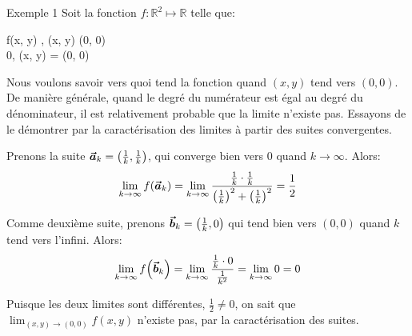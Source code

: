 \documentclass[a4paper]{article}
\begin{document}
\begin{parag}{Exemple 1}
    Soit la fonction $f : \mathbb{R}^2 \mapsto \mathbb{R}$ telle que: 
    \begin{functionbypart}{f\left(x, y\right)}
        , \mathspace {} \left(x, y\right) \neq \left(0, 0\right) \\
        0, \mathspace {} \left(x, y\right) = \left(0, 0\right)
    \end{functionbypart}

    Nous voulons savoir vers quoi tend la fonction quand $\left(x, y\right)$ tend vers $\left(0, 0\right)$. De manière générale, quand le degré du numérateur est égal au degré du dénominateur, il est relativement probable que la limite n'existe pas. Essayons de le démontrer par la caractérisation des limites à partir des suites convergentes.

    Prenons la suite $\bvec{a}_k = \left(\frac{1}{k}, \frac{1}{k}\right)$, qui converge bien vers 0 quand $k \to \infty$. Alors: 
    \[\lim_{k \to \infty} f\left(\bvec{a}_k\right) = \lim_{k \to \infty} \frac{\frac{1}{k} \cdot \frac{1}{k}}{\left(\frac{1}{k}\right)^2 + \left(\frac{1}{k}\right)^2} = \frac{1}{2}\]
    
    Comme deuxième suite, prenons $\bvec{b}_k = \left(\frac{1}{k}, 0\right)$ qui tend bien vers $\left(0, 0\right)$ quand $k$ tend vers l'infini. Alors: 
    \[\lim_{k \to \infty} f\left(\bvec{b}_k\right) = \lim_{k \to \infty} \frac{\frac{1}{k} \cdot 0}{\frac{1}{k^2}} = \lim_{k \to \infty} 0 = 0\]
    
    Puisque les deux limites sont différentes, $\frac{1}{2} \neq 0$, on sait que $\lim_{\left(x,y\right) \to \left(0, 0\right)} f\left(x, y\right)$ n'existe pas, par la caractérisation des suites.
\end{parag}
\end{document}
